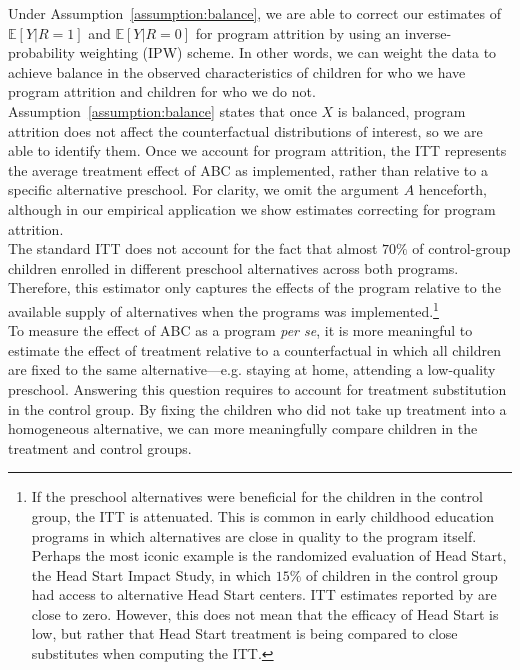 \noindent Under Assumption~\ref{assumption:balance}, we are able to correct our estimates of $\mathbb{E} \left[ Y | R = 1 \right]$ and $\mathbb{E} \left[ Y | R = 0 \right]$ for program attrition by using an inverse-probability weighting (IPW) scheme. In other words, we can weight the data to achieve balance in the observed characteristics of children for who we have program attrition and children for who we do not. Assumption~\ref{assumption:balance} states that once $X$ is balanced, program attrition does not affect the counterfactual distributions of interest, so we are able to identify them. Once we account for program attrition, the ITT represents the average treatment effect of ABC as implemented, rather than relative to a specific alternative preschool. For clarity, we omit the argument $A$ henceforth, although in our empirical application we show estimates correcting for program attrition.\\

\noindent The standard ITT does not account for the fact that almost $70 \%$ of control-group children enrolled in different preschool alternatives across both programs. Therefore, this estimator only captures the effects of the program relative to the available supply of alternatives when the programs was implemented.\footnote{If the preschool alternatives were beneficial for the children in the control group, the ITT is attenuated. This is common in early childhood education programs in which alternatives are close in quality to the program itself. Perhaps the most iconic example is the randomized evaluation of Head Start, the Head Start Impact Study, in which $15\%$ of children in the control group had access to alternative Head Start centers. ITT estimates reported by \cite{Puma_Bell_etal_2010_HeadStartImpact} are close to zero. However, this does not mean that the efficacy of Head Start is low, but rather that Head Start treatment is being compared to close substitutes when computing the ITT.} \\

\noindent To measure the effect of ABC as a program \emph{per se}, it is more meaningful to estimate the effect of treatment relative to a counterfactual in which all children are fixed to the same alternative---e.g. staying at home, attending a low-quality preschool. Answering this question requires  to account for treatment substitution in the control group. By fixing the children who did not take up treatment into a homogeneous alternative, we can more meaningfully compare children in the treatment and control groups. \\

